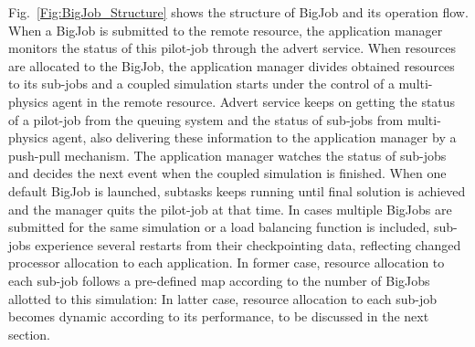 \documentclass[conference,final]{IEEEtran}
\newcommand{\skonote}[1]{ {\textcolor{blue} { ***Jeff: #1 }}}
\newcommand{\skonote}[1]{}
\begin{document}


Fig.~\ref{Fig:BigJob_Structure} shows the structure of BigJob and its
operation flow. When a BigJob is submitted to the remote resource, the
application manager monitors the status of this pilot-job through the
advert service. When resources are allocated to the BigJob, the
application manager divides obtained resources to its sub-jobs and a
coupled simulation starts under the control of a multi-physics agent
in the remote resource. Advert service keeps on getting the status of
a pilot-job from the queuing system and the status of sub-jobs from
multi-physics agent, also delivering these information to the
application manager by a push-pull mechanism. The application manager
watches the status of sub-jobs and decides the next event when the
coupled simulation is finished. When one default BigJob is launched,
subtasks keeps running until final solution is achieved and the
manager quits the pilot-job at that time. In cases multiple BigJobs
are submitted for the same simulation or a load balancing function is
included, sub-jobs experience several restarts from their
checkpointing data, reflecting changed processor allocation to each
application. In former case, resource allocation to each sub-job
follows a pre-defined map according to the number of BigJobs allotted
to this simulation: In latter case, resource allocation to each
sub-job becomes dynamic according to its performance, to be discussed
in the next section.
\end{document}

